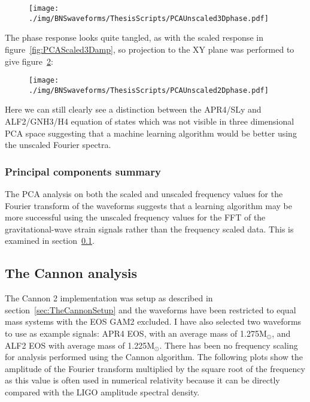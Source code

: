 \begin{figure}[H]
	\centering
	\texttt{[image: ./img/BNSwaveforms/ThesisScripts/PCAUnscaled3Dphase.pdf]} 
	\caption[\protect]{\protect}
	\label{fig:PCAUnscaled3Dphase}
\end{figure}
The phase response looks quite tangled, as with the scaled response in figure~\ref{fig:PCAScaled3Damp}, so projection to the XY plane was performed to give figure~\ref{fig:PCAUnscaled2Dphase}:
\begin{figure}[H]
	\centering
	\texttt{[image: ./img/BNSwaveforms/ThesisScripts/PCAUnscaled2Dphase.pdf]} 
	\caption[\protect]{\protect}
	\label{fig:PCAUnscaled2Dphase}
\end{figure}
Here we can still clearly see a distinction between the APR4/SLy and ALF2/GNH3/H4 equation of states which was not visible in three dimensional PCA space suggesting that a machine learning algorithm would be better using the unscaled Fourier spectra. 
\subsubsection{Principal components summary}
The PCA analysis on both the scaled and unscaled frequency values for the Fourier transform of the waveforms suggests that a learning algorithm may be more successful using the unscaled frequency values for the FFT of the gravitational-wave strain signals rather than the frequency scaled data. This is examined in section~\ref{sec:TheCannon}.

\subsection{The Cannon analysis}
\label{sec:TheCannon}
The Cannon 2 implementation was setup as described in section~\ref{sec:TheCannonSetup} and the waveforms have been restricted to equal mass systems with the EOS GAM2 excluded. I have also selected two waveforms to use as example signals: APR4 EOS, with an average mass of 1.275M$_\odot$, and ALF2 EOS with average mass of 1.225M$_\odot$. There has been no frequency scaling for analysis performed using the Cannon algorithm. The following plots show the amplitude of the Fourier transform multiplied by the square root of the frequency as this value is often used in numerical relativity \citep[eg][]{Clark2015, Takami2015} because it can be directly compared with the LIGO amplitude spectral density. 

